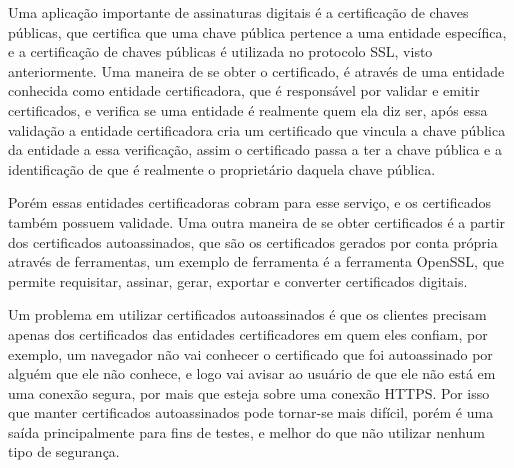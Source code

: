 Uma aplicação importante de assinaturas digitais é a certificação de chaves públicas,
que certifica que uma chave pública pertence a uma entidade específica\cite{kuroseredes2010},
e a certificação de chaves públicas é utilizada no protocolo SSL, visto anteriormente.
Uma maneira de se obter o certificado, é através de uma
entidade conhecida como entidade certificadora, que é responsável por validar e
emitir certificados, e verifica se uma entidade é realmente quem ela diz ser,
após essa validação a entidade certificadora cria um certificado que vincula a
chave pública da entidade a essa verificação, assim o certificado passa a ter a
chave pública e a identificação de que é realmente o proprietário daquela chave pública.

Porém essas entidades certificadoras cobram para esse serviço, e os certificados também
possuem validade. Uma outra maneira de se obter certificados é a partir dos certificados
autoassinados, que são os certificados gerados por conta própria através de
ferramentas, um exemplo de ferramenta é a ferramenta OpenSSL, que permite requisitar,
 assinar, gerar, exportar e converter certificados digitais.

Um problema em utilizar certificados autoassinados é que os clientes precisam
apenas dos certificados das entidades certificadores em quem eles confiam, por
exemplo, um navegador não vai conhecer o certificado que foi autoassinado por
alguém que ele não conhece, e logo vai avisar ao usuário de que ele não está em uma
conexão segura, por mais que esteja sobre uma conexão HTTPS. Por isso que manter certificados
autoassinados pode tornar-se mais difícil, porém é uma saída principalmente para
fins de testes, e melhor do que não utilizar nenhum tipo de segurança.
